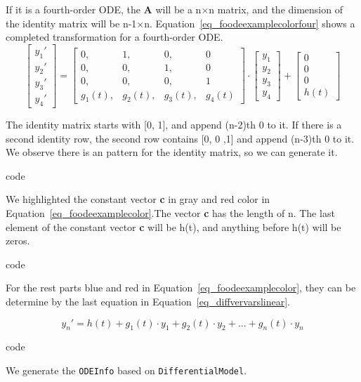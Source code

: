 If it is a fourth-order ODE, the \textbf{A} will be a n$\times$n matrix, and the dimension of the identity matrix will be n-1$\times$n. Equation~\ref{eq_foodeexamplecolorfour} shows a completed transformation for a fourth-order ODE.
\begin{equation} \label{eq_foodeexamplecolorfour}
	\begin{bmatrix}
		{y_{1}'} \\
    {y_{2}'} \\
    {y_{3}'} \\
    {y_{4}'}
	\end{bmatrix}
    = 
  \begin{bmatrix}
		{0}, & {1}, & {0}, & {0} \\
    {0}, & {0}, & {1}, & {0} \\
    {0}, & {0}, & {0}, & {1} \\
    {g_{1}(t)}, & {g_{2}(t)}, & {g_{3}(t)}, & {g_{4}(t)}
	\end{bmatrix}
    \cdot
  \begin{bmatrix}
		{y_{1}} \\
    {y_{2}} \\
    {y_{3}} \\
    {y_{4}}
	\end{bmatrix}
    + 
  \begin{bmatrix}
    {0} \\
    {0} \\
    {0} \\
    {h(t)}
	\end{bmatrix}
\end{equation}

The identity matrix starts with [0, 1], and append (n-2)th 0 to it. If there is a second identity row, the second row contains [0, 0 ,1] and append (n-3)th 0 to it. We observe there is an pattern for the identity matrix, so we can generate it.

code

We highlighted the constant vector \textbf{c} in gray and red color in Equation~\ref{eq_foodeexamplecolor}.The vector \textbf{c} has the length of n. The last element of the constant vector \textbf{c} will be h(t), and anything before h(t) will be zeros.

code

For the rest parts blue and red in Equation~\ref{eq_foodeexamplecolor}, they can be determine by the last equation in Equation~\ref{eq_diffvervarslinear}.

\begin{equation}
  y_{n}' = h(t) + g_{1}(t) \cdot y_{1} + g_{2}(t) \cdot y_{2} + ... + g_{n}(t) \cdot y_{n}
\end{equation}

code

We generate the \verb|ODEInfo| based on \verb|DifferentialModel|.
